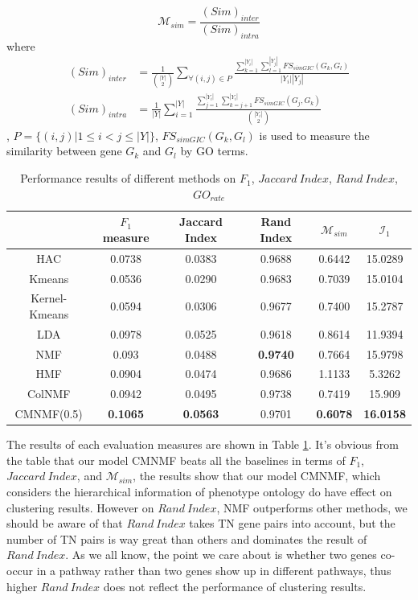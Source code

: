 \documentclass{bmcart}
\begin{document}
$$
\mathcal{M}_{sim} = \frac{(Sim)_{inter}}{(Sim)_{intra}}
$$
where
\begin{equation}\label{}\nonumber
\begin{split}
(Sim)_{inter}&=\frac{1}{{|Y|\choose 2}}\sum_{\forall(i,j)\in P}
\frac{\sum_{k=1}^{|Y_i|}\sum_{l=1}^{|Y_j|}FS_{simGIC}(G_k,G_l)}{|Y_i||Y_j|}\\
(Sim)_{intra}&=\frac{1}{|Y|}\sum_{i=1}^{|Y|}
\frac{\sum_{j=1}^{|Y_i|}\sum_{k=j+1}^{|Y_i|}FS_{simGIC}(G_j,G_k)}{{|Y_i|\choose 2}}
\end{split}
\end{equation}
,
$P=\{(i,j)|1\leq i< j\leq|Y|\}$, $FS_{simGIC}(G_k,G_l)$ \cite{Teng2013} is used to measure the similarity between gene $G_k$ and $G_l$ by GO terms.
\begin{table}[!t]
\centering
\caption{Performance results of different methods on $F_1$, $Jaccard\ Index$, $Rand\ Index$, $GO_{rate}$}\label{tab:measurements}
\begin{tabular}{c|ccccc}
\hline
&$F_1$ measure &Jaccard Index& Rand Index&$\mathcal{M}_{sim}$&$\mathcal{I}_1$\\
\hline
HAC&0.0738&0.0383&0.9688&0.6442&15.0289\\
Kmeans&0.0536&0.0290&0.9683&0.7039&15.0104\\
Kernel-Kmeans&0.0594&0.0306&0.9677&0.7400&15.2787\\
LDA&0.0978&0.0525&0.9618&0.8614&11.9394\\
NMF&0.093&0.0488&\textbf{0.9740}&0.7664&15.9798\\
HMF&0.0904&0.0474&0.9686&1.1133&5.3262\\
ColNMF&0.0942&0.0495&0.9738&0.7419&15.909\\
CMNMF(0.5)&\textbf{0.1065}& \textbf{0.0563}&{0.9701}& \textbf{0.6078}&\textbf{16.0158}\\
\hline
\end{tabular}
\end{table}

The results of each evaluation measures are shown in Table \ref{tab:measurements}.
It's obvious from the table that our model CMNMF beats all the baselines in terms of $F_1$, $Jaccard\ Index$, and $\mathcal{M}_{sim}$, the results show that our model CMNMF, which considers the hierarchical information of phenotype ontology do have effect on clustering results. However on $Rand\ Index$, NMF outperforms other methods, we should be aware of that $Rand\ Index$ takes TN gene pairs into account, but the number of TN pairs is way great than others and dominates the result of $Rand\ Index$. As we all know, the point we care about is whether two genes co-occur in a pathway rather than two genes show up in different pathways, thus higher $Rand\ Index$ does not reflect the performance of clustering results.
\end{document}
